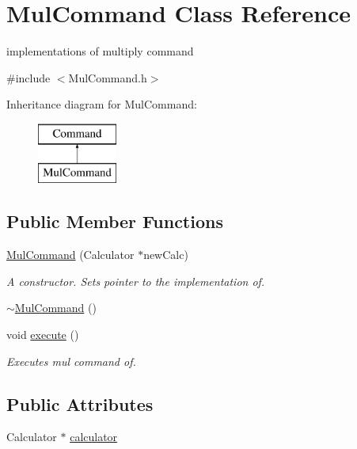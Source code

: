 \hypertarget{class_mul_command}{}\section{Mul\+Command Class Reference}
\label{class_mul_command}


implementations of multiply command  




{\ttfamily \#include $<$Mul\+Command.\+h$>$}

Inheritance diagram for Mul\+Command\+:\begin{figure}[H]
\begin{center}
\leavevmode
\includegraphics[height=2.000000cm]{class_mul_command}
\end{center}
\end{figure}
\subsection*{Public Member Functions}
\begin{DoxyCompactItemize}
\item 
\hyperlink{class_mul_command_ad841942b274629dd6ef16ebff60adc0d}{Mul\+Command} (Calculator $\ast$new\+Calc)
\begin{DoxyCompactList}\small\item\em A constructor. Sets pointer to the implementation of. \end{DoxyCompactList}\item 
\hyperlink{class_mul_command_ac298a4978766f69cd13e8258793a6de1}{$\sim$\+Mul\+Command} ()
\item 
void \hyperlink{class_mul_command_a26122a47a8ddbca2b7a6a3991e04ed66}{execute} ()
\begin{DoxyCompactList}\small\item\em Executes mul command of. \end{DoxyCompactList}\end{DoxyCompactItemize}
\subsection*{Public Attributes}
\begin{DoxyCompactItemize}
\item 
Calculator $\ast$ \hyperlink{class_mul_command_ad1f527968e768963a14e1b59825022d0}{calculator}
\end{DoxyCompactItemize}


